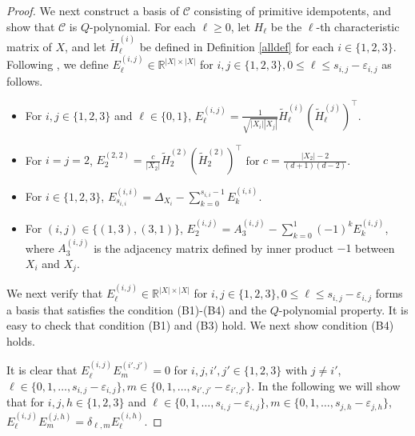\documentclass[11pt]{article}
\theoremstyle{definition}
\theoremstyle{remark}
\begin{document}
\begin{proof}
We next construct a basis of $\mathcal{C}$ consisting of primitive idempotents, and show that $\mathcal{C}$ is $Q$-polynomial.
For each $\ell\geq 0$, let $H_{\ell}$ be the $\ell$-th characteristic matrix of $X$, and let $\widetilde{H}_{\ell}^{(i)}$ be defined in Definition \ref{alldef} for each $i\in\{1,2,3\}$.
Following \cite[Theorem 5.10]{Suda22}, we define $  {E}_\ell^{(i,j)}\in\mathbb{R}^{|X|\times |X|}$ for $i,j\in\{1,2,3\}, 0\leq \ell \leq s_{i,j}-\varepsilon_{i,j}$ as follows.
\begin{itemize}
\item For $i,j\in\{1,2,3\}$ and $\ell\in\{0,1\}$,  $E_\ell^{(i,j)}=\frac{1}{\sqrt{|X_i||X_j|}}\widetilde{H}_\ell^{(i)}(\widetilde{H}_\ell^{(j)})^\top$.
\item For $i=j=2$, $E_2^{(2,2)}=\frac{c}{|X_2|}\widetilde{H}_2^{(2)}(\widetilde{H}_2^{(2)})^\top$ for $c=\frac{|X_2|-2}{(d+1)(d-2)}$.  
\item For $i\in\{1,2,3\}$, $E_{s_{i,i}}^{(i,i)}=\Delta_{X_i}-\sum\limits_{k=0}^{s_{i,i}-1}E_k^{(i,i)}$.
\item For $(i,j)\in \{(1,3),(3,1)\}$, $E_{2}^{(i,j)}=A_3^{(i,j)}-\sum\limits_{k=0}^1(-1)^kE_k^{(i,j)}$, where $A_3^{(i,j)}$ is the adjacency matrix defined by inner product $-1$ between $X_i$ and $X_j$. 
\end{itemize}

We next verify that $  {E}_\ell^{(i,j)}\in\mathbb{R}^{|X|\times |X|}$ for $i,j\in\{1,2,3\}, 0\leq \ell \leq s_{i,j}-\varepsilon_{i,j}$ forms a basis that satisfies the condition (B1)-(B4) and the $Q$-polynomial property. It is easy to check that condition (B1) and (B3) hold. We next show condition (B4) holds.

It is clear that $E_\ell^{(i,j)}E_m^{(i',j')}=0$ for $i,j,i',j'\in\{1,2,3\}$ with $j\neq i'$, $\ell\in\{0,1,\ldots,s_{i,j}-\varepsilon_{i,j}\},m\in\{0,1,\ldots,s_{i',j'}-\varepsilon_{i',j'}\}$. 
In the following we will show that for $i,j,h\in\{1,2,3\}$ and $\ell\in\{0,1,\ldots,s_{i,j}-\varepsilon_{i,j}\},m\in\{0,1,\ldots,s_{j,h}-\varepsilon_{j,h}\}$, $  {E}_\ell^{(i,j)}  {E}_m^{(j,h)}=\delta_{\ell,m}  {E}_\ell^{(i,h)}$. 


\end{proof}
\end{document}
